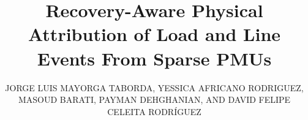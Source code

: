 \history{}
\doi{}

\title{Recovery-Aware Physical Attribution of Load and Line Events From Sparse PMUs}
\author{\uppercase{Jorge Luis Mayorga Taborda}, \uppercase{Yessica Africano Rodriguez}, \uppercase{Masoud Barati}, \uppercase{Payman Dehghanian}, AND \uppercase{David Felipe Celeita Rodr\'iguez}}

\address[1]{Universidad de los Andes, Bogot\'a, Colombia}
\address[2]{Department of Electrical and Computer Engineering, University of Pittsburgh, Pittsburgh, PA, USA}
\address[3]{Department of Electrical and Computer Engineering, The George Washington University, Washington, DC, USA}
\address[4]{Faculty of Engineering, Universidad de La Sabana, Ch\'ia, Colombia}

